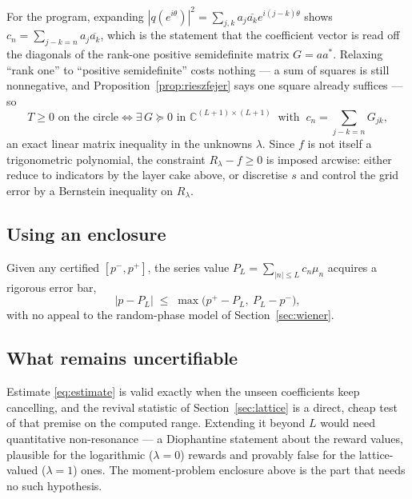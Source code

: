 \documentclass[11pt]{article}
\begin{document}
For the program, expanding $|q(e^{i\theta})|^2=\sum_{j,k}a_j\overline{a_k}e^{i(j-k)\theta}$ shows
$c_n=\sum_{j-k=n}a_j\overline{a_k}$, which is the statement that the coefficient vector is read off
the diagonals of the rank-one positive semidefinite matrix $G=aa^{*}$. Relaxing ``rank one'' to
``positive semidefinite'' costs nothing --- a sum of squares is still nonnegative, and
Proposition~\ref{prop:rieszfejer} says one square already suffices --- so
\[
  T\ge0 \text{ on the circle}
  \iff
  \exists\, G\succeq0 \text{ in } \mathbb C^{(L+1)\times(L+1)}
  \ \text{ with }\ c_n=\!\!\sum_{j-k=n}\!\! G_{jk},
\]
an exact linear matrix inequality in the unknowns $\lambda$. Since $f$ is not itself a trigonometric
polynomial, the constraint $R_\lambda-f\ge0$ is imposed arcwise: either reduce to indicators by the
layer cake above, or discretise $s$ and control the grid error by a Bernstein inequality on
$R_\lambda$.

\subsection{Using an enclosure}

Given any certified $[p^-,p^+]$, the series value $P_L=\sum_{|n|\le L}c_n\mu_n$ acquires a rigorous
error bar,
\[
  |p-P_L|\;\le\;\max\big(p^+-P_L,\ P_L-p^-\big),
\]
with no appeal to the random-phase model of Section~\ref{sec:wiener}.

\subsection{What remains uncertifiable}

Estimate \eqref{eq:estimate} is valid exactly when the unseen coefficients keep cancelling, and the
revival statistic of Section~\ref{sec:lattice} is a direct, cheap test of that premise on the
computed range. Extending it beyond $L$ would need quantitative non-resonance --- a Diophantine
statement about the reward values, plausible for the logarithmic ($\lambda=0$) rewards and provably
false for the lattice-valued ($\lambda=1$) ones. The moment-problem enclosure above is the part that
needs no such hypothesis.
\end{document}
